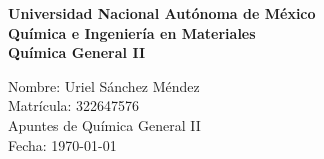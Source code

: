 \documentclass[12pt]{article}
\begin{document}
\begin{titlepage}
\thispagestyle{empty}
\begin{center}
\vspace*{2cm}
\fontsize{14}{30}\selectfont\textbf{Universidad Nacional Autónoma de México} \\
\vspace{1cm}
\fontsize{14}{30}\selectfont\textbf{Química e Ingeniería en Materiales} \\
\vspace{1cm}
\fontsize{14}{30}\selectfont\textbf{Química General II} \\
\end{center}
\vspace{2cm}
\begin{flushright}
    \fontsize{14}{30}\selectfont
        \hspace{2cm} Nombre: Uriel Sánchez Méndez \\
        \hspace{2cm} Matrícula: 322647576 \\
        \hspace{2cm} Apuntes de Química General II \\
        \hspace{2cm} Fecha: \today \\
\end{flushright}
\end{titlepage}

\tableofcontents
\thispagestyle{empty}
\newpage





\end{document}
